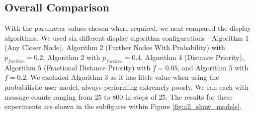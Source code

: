 \documentclass[bsc,frontabs,twoside,singlespacing,parskip,deptreport]{infthesis}     %
\begin{document}
\subsection{Overall Comparison} \label{subsec:all_show_models_results}
With the parameter values chosen where required, we next compared the display algorithms. We used six different display algorithm configurations - Algorithm 1 (Any Closer Node), Algorithm 2 (Further Nodes With Probability) with $p_{further}=0.2$, Algorithm 2 with $p_{further}=0.4$, Algorithm 4 (Distance Priority), Algorithm 5 (Fractional Distance Priority) with $f=0.05$, and Algorithm 5 with $f=0.2$. We excluded Algorithm 3 as it has little value when using the probabilistic user model, always performing extremely poorly. We ran each with message counts ranging from 25 to 800 in steps of 25. The results for these experiments are shown in the subfigures within Figure \ref{fig:all_show_models}.
\end{document}
